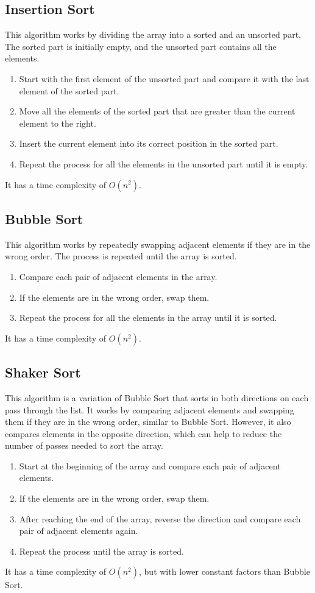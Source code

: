 \subsection{Insertion Sort}

This algorithm works by dividing the array into a sorted and an unsorted part. The sorted part is initially empty, and the unsorted part contains all the elements.
\begin{enumerate}
    \item Start with the first element of the unsorted part and compare it with the last element of the sorted part.
    \item Move all the elements of the sorted part that are greater than the current element to the right.
    \item Insert the current element into its correct position in the sorted part.
    \item Repeat the process for all the elements in the unsorted part until it is empty.
\end{enumerate}

It has a time complexity of $O(n^2)$.

\subsection{Bubble Sort}

This algorithm works by repeatedly swapping adjacent elements if they are in the wrong order. The process is repeated until the array is sorted.
\begin{enumerate}
    \item Compare each pair of adjacent elements in the array.
    \item If the elements are in the wrong order, swap them.
    \item Repeat the process for all the elements in the array until it is sorted.
\end{enumerate}
It has a time complexity of $O(n^2)$.

\subsection{Shaker Sort}

This algorithm is a variation of Bubble Sort that sorts in both directions on each pass through the list. It works by comparing adjacent elements and swapping them if they are in the wrong order, similar to Bubble Sort. However, it also compares elements in the opposite direction, which can help to reduce the number of passes needed to sort the array.
\begin{enumerate}
    \item Start at the beginning of the array and compare each pair of adjacent elements.
    \item If the elements are in the wrong order, swap them.
    \item After reaching the end of the array, reverse the direction and compare each pair of adjacent elements again.
    \item Repeat the process until the array is sorted.
\end{enumerate}
It has a time complexity of $O(n^2)$, but with lower constant factors than Bubble Sort.

